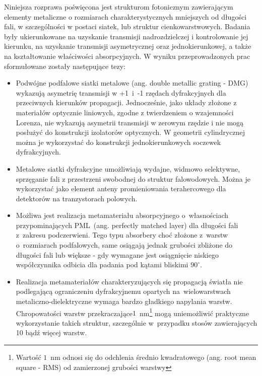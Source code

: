 Niniejsza rozprawa poświęcona jest strukturom fotonicznym zawierającym elementy metaliczne o rozmiarach charakterystycznych mniejszych od długości fali, w szczególności w postaci siatek, lub struktur cienkowarstwowych. Badania były ukierunkowane na uzyskanie  transmisji nadrozdzielczej i kontrolowanie jej kierunku, na uzyskanie transmisji asymetrycznej oraz jednokierunkowej, a także na kształtowanie właściwości absorpcyjnych. W wyniku przeprowadzonych prac sformułowane zostały następujące tezy:

\begin{itemize}
\item Podwójne podfalowe siatki metalowe (ang. double metallic grating - DMG) wykazują asymetrię transmisji w +1~i~-1 rzędach dyfrakcyjnych dla przeciwnych kierunków propagacji. Jednocześnie, jako układy złożone z materiałów optycznie liniowych, zgodne z twierdzeniem o wzajemności Lorenza, nie wykazują asymetrii transmisji w zerowym rzędzie i nie mogą posłużyć do konstrukcji izolatorów optycznych. W geometrii cylindrycznej można je wykorzystać do konstrukcji jednokierunkowych soczewek dyfrakcyjnych.

\item Metalowe siatki dyfrakcyjne umożliwiają wydajne, widmowo selektywne, sprzęganie fali z przestrzeni swobodnej do struktur falowodowych. Można je wykorzystać jako element anteny promieniowania terahercowego dla detektorów na tranzystorach polowych.

\item Możliwa jest realizacja metamateriału absorpcyjnego o~własnościach przypominających PML~(ang. perfectly matched layer) dla długości fali z~zakresu podczerwieni. Tego typu absorbery choć złożone z~warstw o~rozmiarach podfalowych, same osiągają jednak grubości zbliżone do długości fali lub większe - gdy wymagane jest osiągnięcie niskiego współczynnika odbicia dla padania pod kątami bliskimi $90^{\circ}$.

\item Realizacja metamateriałów charakteryzujących się propagacją światła nie podlegającą ograniczeniu dyfrakcyjnemu opartych na~wielowarstwach metaliczno-dielektryczne wymaga bardzo gładkiego napylania warstw. Chropowatości warstw przekraczające$1$~nm\footnote{Wartość $1$~nm odnosi się do odchlenia średnio kwadratowego (ang. root mean square - RMS) od zamierzonej grubości warstwy} mogą uniemożliwić praktyczne wykorzystanie takich struktur, szczególnie w~przypadku stosów zawierających 10 bądź więcej warstw.
\end{itemize}
